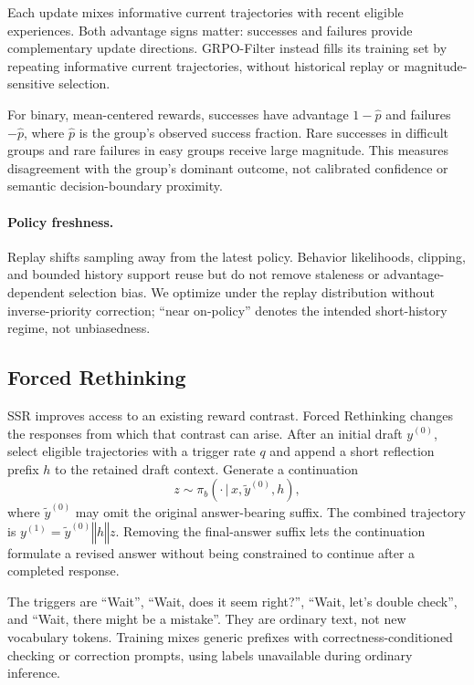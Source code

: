 \documentclass[twocolumn]{article}
\newcommand{\given}{\,\vert\,}
\begin{document}
Each update mixes informative current trajectories with recent eligible experiences. Both advantage signs matter: successes and failures provide complementary update directions. GRPO-Filter instead fills its training set by repeating informative current trajectories, without historical replay or magnitude-sensitive selection.

For binary, mean-centered rewards, successes have advantage $1-\widehat p$ and failures $-\widehat p$, where $\widehat p$ is the group's observed success fraction. Rare successes in difficult groups and rare failures in easy groups receive large magnitude. This measures disagreement with the group's dominant outcome, not calibrated confidence or semantic decision-boundary proximity.

\paragraph{Policy freshness.}
Replay shifts sampling away from the latest policy. Behavior likelihoods, clipping, and bounded history support reuse but do not remove staleness or advantage-dependent selection bias. We optimize under the replay distribution without inverse-priority correction; ``near on-policy'' denotes the intended short-history regime, not unbiasedness.

\subsection{Forced Rethinking}
\label{sec:rethinking}

SSR improves access to an existing reward contrast. Forced Rethinking changes the responses from which that contrast can arise. After an initial draft $y^{(0)}$, select eligible trajectories with a trigger rate $q$ and append a short reflection prefix $h$ to the retained draft context. Generate a continuation
\begin{equation}
 z\sim\pi_b(\cdot\given x,\widetilde y^{(0)},h),
 \label{eq:continuation}
\end{equation}
where $\widetilde y^{(0)}$ may omit the original answer-bearing suffix. The combined trajectory is $y^{(1)}=\widetilde y^{(0)}\mathbin\Vert h\mathbin\Vert z$. Removing the final-answer suffix lets the continuation formulate a revised answer without being constrained to continue after a completed response.

The triggers are ``Wait'', ``Wait, does it seem right?'', ``Wait, let's double check'', and ``Wait, there might be a mistake''. They are ordinary text, not new vocabulary tokens. Training mixes generic prefixes with correctness-conditioned checking or correction prompts, using labels unavailable during ordinary inference.
\end{document}
